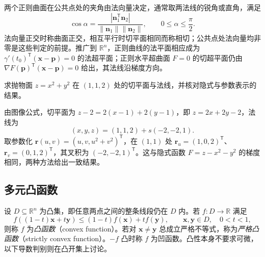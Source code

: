 两个正则曲面在公共点处的夹角由法向量决定，通常取两法线的锐角或直角，满足
\[
    \cos\alpha=\frac{|\boldsymbol n_1^{\mathsf T}\boldsymbol n_2|}
       {\|\boldsymbol n_1\|\|\boldsymbol n_2\|},\qquad 0\leq\alpha\leq\frac\pi2.
\]
法向量正交时称曲面正交，相互平行时切平面相同而称相切；公共点处法向量均非零是这些判定的前提。推广到 $\mathbb R^n$，正则曲线的法平面相应成为 $\gamma'(t_0)^{\mathsf T}(\boldsymbol x-\boldsymbol p)=0$ 的法超平面；正则水平超曲面 $F=0$ 的切超平面仍由 $\nabla F(\boldsymbol p)^{\mathsf T}(\boldsymbol x-\boldsymbol p)=0$ 给出，其法线沿梯度方向。

\begin{example}
\label{ex:graph-and-parametric-surface-tangent-ch14}
求抛物面 $z=x^2+y^2$ 在 $(1,1,2)$ 处的切平面与法线，并核对隐式与参数表示的结果。
\end{example}
\begin{solve}
由图像公式，切平面为 $z-2=2(x-1)+2(y-1)$，即 $z=2x+2y-2$，法线为
\[
    (x,y,z)=(1,1,2)+s(-2,-2,1).
\]
取参数化 $\boldsymbol r(u,v)=(u,v,u^2+v^2)^{\mathsf T}$，在 $(1,1)$ 处 $\boldsymbol r_u=(1,0,2)^{\mathsf T}$、$\boldsymbol r_v=(0,1,2)^{\mathsf T}$，其叉积为 $(-2,-2,1)^{\mathsf T}$。这与隐式函数 $F=z-x^2-y^2$ 的梯度相同，两种方法给出一致结果。
\end{solve}

\subsection{多元凸函数}
\label{subsec:multivariable-convex-functions}

\begin{definition}
\label{def:multivariable-convex-function-ch14}
设 $D\subseteq\mathbb R^n$ 为凸集，即任意两点之间的整条线段仍在 $D$ 内。若 $f:D\to\mathbb R$ 满足
\[
    f((1-t)\boldsymbol x+t\boldsymbol y)
       \leq(1-t)f(\boldsymbol x)+tf(\boldsymbol y),\qquad
    \boldsymbol x,\boldsymbol y\in D,\quad 0<t<1,
\]
则称 $f$ 为\emph{凸函数}（convex function）。若对 $\boldsymbol x\ne\boldsymbol y$ 总成立严格不等式，称为\emph{严格凸函数}（strictly convex function）。$-f$ 凸时称 $f$ 为凹函数。凸性本身不要求可微，以下导数判别则在凸开集上讨论。
\end{definition}


